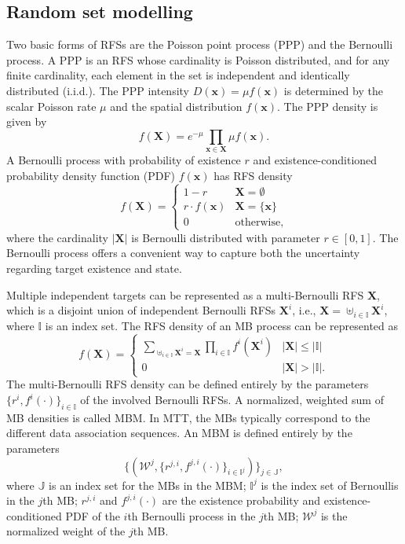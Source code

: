 \documentclass[journal]{IEEEtran}
\begin{document}
\subsection{Random set modelling}
Two basic forms of RFSs are the Poisson point process (PPP) and the Bernoulli process. A PPP is an RFS whose cardinality is Poisson distributed, and for any finite cardinality, each element in the set is independent and identically distributed (i.i.d.). The PPP intensity $D(\mathbf{x})=\mu f(\mathbf{x})$ is determined by the scalar Poisson rate $\mu$ and the spatial distribution $f(\mathbf{x})$. The PPP density is given by
\begin{equation}
f(\mathbf{X}) = e^{-\mu}\prod_{\mathbf{x}\in\mathbf{X}}\mu f(\mathbf{x}).
\label{eq:ppp}
\end{equation}
A Bernoulli process with probability of existence $r$ and existence-conditioned probability density function (PDF) $f(\mathbf{x})$ has RFS density
\begin{equation}
f(\mathbf{X}) = \begin{cases}
    1-r& \mathbf{X}=\emptyset\\
    r\cdot f(\mathbf{x})& \mathbf{X}=\{\mathbf{x}\}\\
    0& \text{otherwise},
\end{cases}
\label{eq:bernoulli}
\end{equation}
where the cardinality $|\mathbf{X}|$ is Bernoulli distributed with parameter $r\in[0,1]$. The Bernoulli process offers a convenient way to capture both the uncertainty regarding target existence and state. 

Multiple independent targets can be represented as a multi-Bernoulli RFS $\mathbf{X}$, which is a disjoint union of independent Bernoulli RFSs $\mathbf{X}^i$, i.e., $\mathbf{X}=\uplus_{i\in\mathbb{I}} \mathbf{X}^i$, where $\mathbb{I}$ is an index set. The RFS density of an MB process can be represented as \cite{pmbmextended2}
\begin{equation}
f(\mathbf{X}) = 
\begin{cases}
\sum_{\uplus_{i\in\mathbb{I}}\mathbf{X}^i=\mathbf{X}}\prod_{i\in\mathbb{I}}f^i(\mathbf{X}^i) & |\mathbf{X}| \leq |\mathbb{I}| \\
0 & |\mathbf{X}| > |\mathbb{I}|.
\end{cases}
\label{eq:mb}
\end{equation}
The multi-Bernoulli RFS density can be defined entirely by the parameters $\{r^i,f^i(\cdot)\}_{i\in\mathbb{I}}$ of the involved Bernoulli RFSs. A normalized, weighted sum of MB densities is called MBM. In MTT, the MBs typically correspond to the different data association sequences. An MBM is defined entirely by the parameters
\begin{equation}
    \{(\mathcal{W}^j,\{r^{j,i},f^{j,i}(\cdot)\}_{i\in\mathbb{I}^j})\}_{j\in\mathbb{J}},
    \label{eq:mbm}
\end{equation}
where $\mathbb{J}$ is an index set for the MBs in the MBM; $\mathbb{I}^j$ is the index set of Bernoullis in the $j$th MB; $r^{j,i}$ and $f^{j,i}(\cdot)$ are the existence probability and existence-conditioned PDF of the $i$th Bernoulli process in the $j$th MB; $\mathcal{W}^j$ is the normalized weight of the $j$th MB. 
\end{document}
